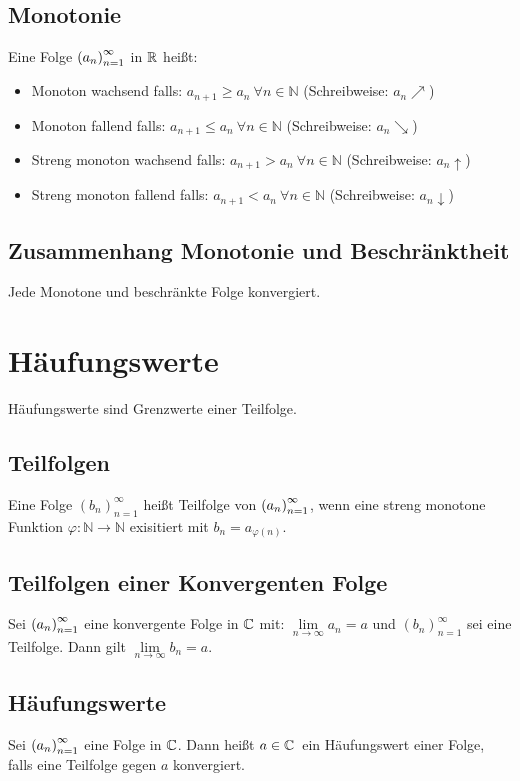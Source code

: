 \subsection{Monotonie}
Eine Folge ${(a_n)}_{n=1}^\infty$ in $\mathbb{R}$ heißt:
\begin{itemize}
    \item Monoton wachsend falls: $a_{n+1} \geq {a_n}\ \forall n \in \mathbb{N}$ (Schreibweise: $a_n \nearrow$)
    \item Monoton fallend falls: $a_{n+1} \leq {a_n}\ \forall n \in \mathbb{N}$ (Schreibweise: $a_n \searrow$)
    \item Streng monoton wachsend falls: $a_{n+1} > {a_n}\ \forall n \in \mathbb{N}$ (Schreibweise: $a_n \uparrow$)
    \item Streng monoton fallend falls: $a_{n+1} < {a_n}\ \forall n \in \mathbb{N}$ (Schreibweise: $a_n \downarrow$)
\end{itemize}

\subsection{Zusammenhang Monotonie und Beschränktheit}
Jede Monotone und beschränkte Folge konvergiert.

\section{Häufungswerte}
Häufungswerte sind Grenzwerte einer Teilfolge.

\subsection{Teilfolgen}
Eine Folge ${(b_n)}_{n=1}^\infty$ heißt Teilfolge von ${(a_n)}_{n=1}^\infty$, wenn
eine streng monotone Funktion $\varphi: \mathbb{N} \rightarrow \mathbb{N}$ exisitiert
mit $b_n = a_{\varphi(n)}$.

\subsection{Teilfolgen einer Konvergenten Folge}
Sei ${(a_n)}_{n=1}^\infty$ eine konvergente Folge in $\mathbb{C}$ mit:
$\lim\limits_{n \rightarrow \infty} a_n = a$ und ${(b_n)}_{n=1}^\infty$
sei eine Teilfolge. Dann gilt $\lim\limits_{n \rightarrow \infty} b_n = a$.

\subsection{Häufungswerte} Sei ${(a_n)}_{n=1}^\infty$ eine Folge in $\mathbb{C}$. Dann heißt
$a \in\mathbb{C}$\ ein Häufungswert einer Folge, falls eine Teilfolge gegen $a$ konvergiert.

